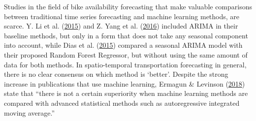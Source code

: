 \documentclass[12pt,oneside]{reedthesis}
\begin{document}
Studies in the field of bike availability forecasting that make valuable
comparisons between traditional time series forecasting and machine
learning methods, are scarce. Y. Li et al.
(\protect\hyperlink{ref-li2015}{2015}) and Z. Yang et al.
(\protect\hyperlink{ref-yang2016}{2016}) included ARIMA in their
baseline methods, but only in a form that does not take any seasonal
component into account, while Dias et al.
(\protect\hyperlink{ref-dias2015}{2015}) compared a seasonal ARIMA model
with their proposed Random Forest Regressor, but without using the same
amount of data for both methods. In spatio-temporal transportation
forecasting in general, there is no clear consensus on which method is
`better'. Despite the strong increase in publications that use machine
learning, Ermagun \& Levinson
(\protect\hyperlink{ref-ermagun2018}{2018}) state that ``there is not a
certain superiority when machine learning methods are compared with
advanced statistical methods such as autoregressive integrated moving
average.''
\end{document}
